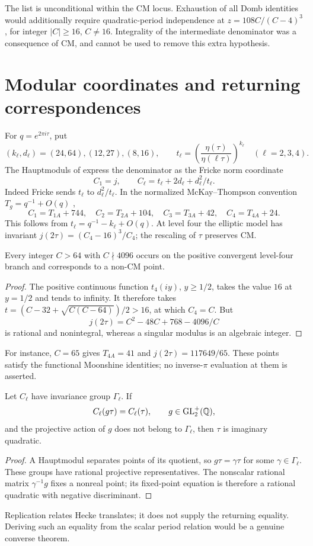 The list is unconditional within the CM locus. Exhaustion of all
Domb identities would additionally require quadratic-period independence
at $z=108C/(C-4)^3$, for integer $|C|\ge16$, $C\ne16$. Integrality of
the intermediate denominator was a consequence of CM, and cannot be
used to remove this extra hypothesis.

\section{Modular coordinates and returning correspondences}
\label{sec:moonshine}
For $q=e^{2\pi i\tau}$, put
\[
 (k_\ell,d_\ell)=(24,64),(12,27),(8,16),\qquad
 t_\ell=\left(\frac{\eta(\tau)}{\eta(\ell\tau)}\right)^{k_\ell}
 \quad(\ell=2,3,4).
\]
The Hauptmoduls of \cite[Table~2]{CCY} express the denominator as the
Fricke norm coordinate
\[
 C_1=j,\qquad C_\ell=t_\ell+2d_\ell+d_\ell^2/t_\ell.
\]
Indeed Fricke sends $t_\ell$ to $d_\ell^2/t_\ell$. In the normalized
McKay--Thompson convention $T_g=q^{-1}+O(q)$ \cite{CN},
\begin{equation}\label{eq:moonshine-shifts}
 C_1=T_{1A}+744,\quad C_2=T_{2A}+104,\quad
 C_3=T_{3A}+42,\quad C_4=T_{4A}+24.
\end{equation}
This follows from $t_\ell=q^{-1}-k_\ell+O(q)$. At level four the
elliptic model has invariant $j(2\tau)=(C_4-16)^3/C_4$; the rescaling
of $\tau$ preserves CM.

\begin{proposition}
Every integer $C>64$ with $C\nmid4096$ occurs on the positive convergent
level-four branch and corresponds to a non-CM point.
\end{proposition}
\begin{proof}
The positive continuous function $t_4(iy)$, $y\ge1/2$, takes the
value $16$ at $y=1/2$ and tends to infinity. It therefore takes
$t=(C-32+\sqrt{C(C-64)})/2>16$, at which $C_4=C$. But
\[
 j(2\tau)=C^2-48C+768-4096/C
\]
is rational and nonintegral, whereas a singular modulus is an algebraic
integer.
\end{proof}
For instance, $C=65$ gives $T_{4A}=41$ and $j(2\tau)=117649/65$.
These points satisfy the functional Moonshine identities; no
inverse-$\pi$ evaluation at them is asserted.

\begin{proposition}
Let $C_\ell$ have invariance group $\Gamma_\ell$. If
\[
 C_\ell(g\tau)=C_\ell(\tau),\qquad g\in\mathrm{GL}_2^+(\mathbb Q),
\]
and the projective action of $g$ does not belong to $\Gamma_\ell$,
then $\tau$ is imaginary quadratic.
\end{proposition}
\begin{proof}
A Hauptmodul separates points of its quotient, so
$g\tau=\gamma\tau$ for some $\gamma\in\Gamma_\ell$. These groups
have rational projective representatives. The nonscalar rational
matrix $\gamma^{-1}g$ fixes a nonreal point; its fixed-point equation
is therefore a rational quadratic with negative discriminant.
\end{proof}
Replication relates Hecke translates; it does not supply the returning
equality. Deriving such an equality from the scalar period relation
would be a genuine converse theorem.

